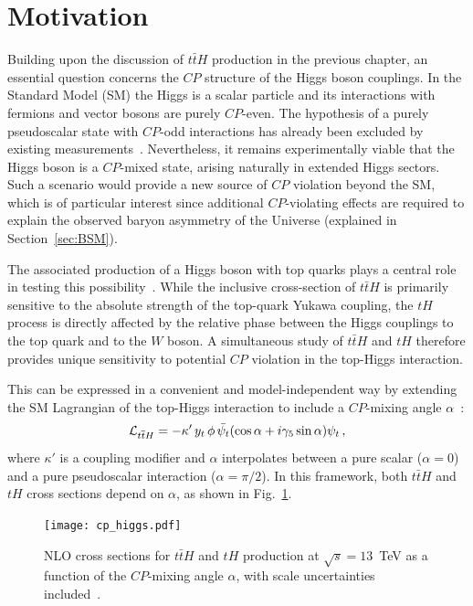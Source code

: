 \section{Motivation}

Building upon the discussion of $t\bar{t}H$ production in the previous chapter, an essential question concerns the $CP$ structure of the Higgs boson couplings. 
In the Standard Model (SM) the Higgs is a scalar particle and its interactions with fermions and vector bosons are purely $CP$-even. 
The hypothesis of a purely pseudoscalar state with $CP$-odd interactions has already been excluded by existing measurements~\cite{ATLAS:2015yey,CMS:2014quz,ATLAS:2022ers,CMS:2022dbx}. 
Nevertheless, it remains experimentally viable that the Higgs boson is a $CP$-mixed state, arising naturally in extended Higgs sectors. 
Such a scenario would provide a new source of $CP$ violation beyond the SM, which is of particular interest since additional $CP$-violating effects are required to explain the observed baryon asymmetry of the Universe (explained in Section~\ref{sec:BSM}). 

The associated production of a Higgs boson with top quarks plays a central role in testing this possibility~\cite{Gunion:1996xu, Ellis:2013yxa, He:2015spx, Boudjema:2015nda}. 
While the inclusive cross-section of $t\bar{t}H$ is primarily sensitive to the absolute strength of the top-quark Yukawa coupling, the $tH$ process is directly affected by the relative phase between the Higgs couplings to the top quark and to the $W$ boson. 
A simultaneous study of $t\bar{t}H$ and $tH$ therefore provides unique sensitivity to potential $CP$ violation in the top-Higgs interaction. 

This can be expressed in a convenient and model-independent way by extending the SM Lagrangian of the top-Higgs interaction to include a $CP$-mixing angle $\alpha$~\cite{Demartin_2014}:
\begin{equation}
{\cal L}_{t\overline{t}H}=-\kappa' \, y_t \, \phi \, \bar{\psi_t}(\cos{\alpha} + i\gamma_5\sin{\alpha})\psi_t\,,
\end{equation}
where $\kappa'$ is a coupling modifier and $\alpha$ interpolates between a pure scalar ($\alpha=0$) and a pure pseudoscalar interaction ($\alpha=\pi/2$). 
In this framework, both $t\bar{t}H$ and $tH$ cross sections depend on $\alpha$, as shown in Fig.~\ref{fig:th_cp_dependence}. 

\begin{figure}[htbp]
  \centering
  \texttt{[image: cp\_higgs.pdf]}
  \caption{NLO cross sections for $t\bar{t}H$ and $tH$ production at $\sqrt{s}=13$~TeV as a function of the $CP$-mixing angle $\alpha$, with scale uncertainties included~\cite{demartin2015}.}
  \label{fig:th_cp_dependence}
\end{figure}

